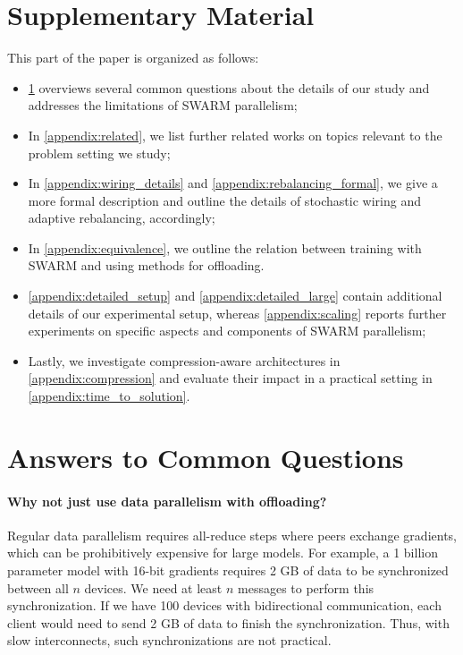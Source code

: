\clearpage
\appendix
\section*{Supplementary Material}

This part of the paper is organized as follows:
\begin{itemize}
    \item \cref{appendix:faq} overviews several common questions about the details of our study and addresses the limitations of SWARM parallelism;
    \item In \cref{appendix:related}, we list further related works on topics relevant to the problem setting we study;
    \item In \cref{appendix:wiring_details} and \cref{appendix:rebalancing_formal}, we give a more formal description and outline the details of stochastic wiring and adaptive rebalancing, accordingly;
    \item In \cref{appendix:equivalence}, we outline the relation between training with SWARM and using methods for offloading.
    \item \cref{appendix:detailed_setup} and  \cref{appendix:detailed_large} contain additional details of our experimental setup, whereas \cref{appendix:scaling} reports further experiments on specific aspects and components of SWARM parallelism;
    \item Lastly, we investigate compression-aware architectures in \cref{appendix:compression} and evaluate their impact in a practical setting in \cref{appendix:time_to_solution}.
\end{itemize}

\section{Answers to Common Questions}
\label{appendix:faq}


\paragraph{Why not just use data parallelism with offloading?}

Regular data parallelism requires all-reduce steps where peers exchange gradients, which can be prohibitively expensive for large models. For example, a 1 billion parameter model with 16-bit gradients requires 2 GB of data to be synchronized between all $n$ devices. We need at least $n$ messages to perform this synchronization. If we have 100 devices with bidirectional communication, each client would need to send 2 GB of data to finish the synchronization. Thus, with slow interconnects, such synchronizations are not practical.

